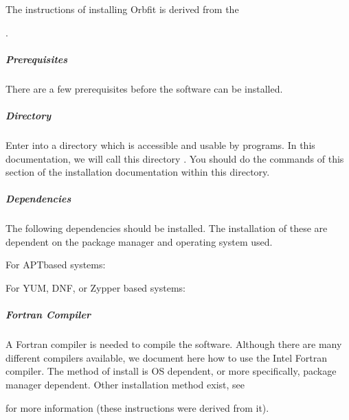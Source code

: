 \documentclass[letterpaper,11pt,english]{sphinxmanual}
\begin{document}
\sphinxAtStartPar
The instructions of installing Orbfit is derived from the
%
\begin{footnote}[37]\sphinxAtStartFootnote
{}
%
\end{footnote}.


\subparagraph{Prerequisites}
\label{\detokenize{technical/installation/orbfit:prerequisites}}
\sphinxAtStartPar
There are a few prerequisites before the software can be installed.


\subparagraph{Directory}
\label{\detokenize{technical/installation/orbfit:directory}}
\sphinxAtStartPar
Enter into a directory which is accessible and usable by programs. In this
documentation, we will call this directory . You should do the
commands of this section of the installation documentation within this
directory.


\subparagraph{Dependencies}
\label{\detokenize{technical/installation/orbfit:dependencies}}
\sphinxAtStartPar
The following dependencies should be installed. The installation of these are
dependent on the package manager and operating system used.

\sphinxAtStartPar
For APT\sphinxhyphen{}based systems:

\begin{sphinxVerbatim}[commandchars=\\\{\}]
      
\end{sphinxVerbatim}

\sphinxAtStartPar
For YUM, DNF, or Zypper based systems:

\begin{sphinxVerbatim}[commandchars=\\\{\}]
      
\end{sphinxVerbatim}


\subparagraph{Fortran Compiler}
\label{\detokenize{technical/installation/orbfit:fortran-compiler}}
\sphinxAtStartPar
A Fortran compiler is needed to compile the software. Although there are many
different compilers available, we document here how to use the Intel Fortran
compiler. The method of install is OS dependent, or more specifically, package
manager dependent. Other installation method exist, see
%
\begin{footnote}[38]\sphinxAtStartFootnote
{}
%
\end{footnote} for more information (these instructions were
derived from it).
\end{document}
